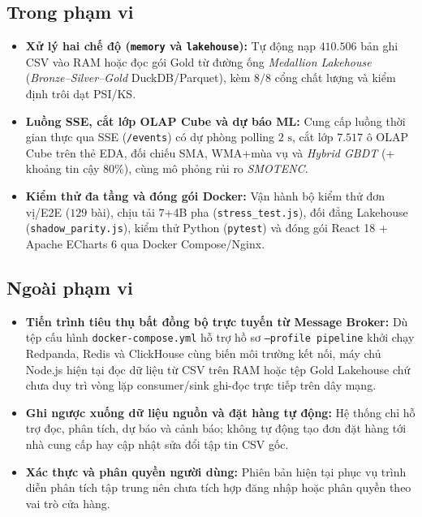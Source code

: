 \subsection*{Trong phạm vi}
\label{sec:in-scope}
\begin{itemize}[topsep=0pt, itemsep=1pt]
	\item \textbf{Xử lý hai chế độ (\texttt{memory} và \texttt{lakehouse}):} Tự động nạp $410.506$ bản ghi CSV vào RAM hoặc đọc gói Gold từ đường ống \textit{Medallion Lakehouse} (\textit{Bronze--Silver--Gold} DuckDB/Parquet), kèm $8/8$ cổng chất lượng và kiểm định trôi dạt PSI/KS.
	\item \textbf{Luồng SSE, cắt lớp OLAP Cube và dự báo ML:} Cung cấp luồng thời gian thực qua SSE (\texttt{/events}) có dự phòng polling $2\text{ s}$, cắt lớp $7.517$ ô OLAP Cube trên thẻ EDA, đối chiếu SMA, WMA+mùa vụ và \textit{Hybrid GBDT} (+ khoảng tin cậy $80\%$), cùng mô phỏng rủi ro \textit{SMOTENC}.
	\item \textbf{Kiểm thử đa tầng và đóng gói Docker:} Vận hành bộ kiểm thử đơn vị/E2E ($129$ bài), chịu tải $7$+4B pha (\texttt{stress_test.js}), đối đẳng Lakehouse (\texttt{shadow_parity.js}), kiểm thử Python (\texttt{pytest}) và đóng gói React 18 + Apache ECharts 6 qua Docker Compose/Nginx.
\end{itemize}

\subsection*{Ngoài phạm vi}
\label{sec:out-of-scope}
\begin{itemize}[topsep=0pt, itemsep=1pt]
	\item \textbf{Tiến trình tiêu thụ bất đồng bộ trực tuyến từ Message Broker:} Dù tệp cấu hình \texttt{docker-compose.yml} hỗ trợ hồ sơ \texttt{--profile pipeline} khởi chạy Redpanda, Redis và ClickHouse cùng biến môi trường kết nối, máy chủ Node.js hiện tại đọc dữ liệu từ CSV trên RAM hoặc tệp Gold Lakehouse chứ chưa duy trì vòng lặp consumer/sink ghi-đọc trực tiếp trên dây mạng.
	\item \textbf{Ghi ngược xuống dữ liệu nguồn và đặt hàng tự động:} Hệ thống chỉ hỗ trợ đọc, phân tích, dự báo và cảnh báo; không tự động tạo đơn đặt hàng tới nhà cung cấp hay cập nhật sửa đổi tập tin CSV gốc.
	\item \textbf{Xác thực và phân quyền người dùng:} Phiên bản hiện tại phục vụ trình diễn phân tích tập trung nên chưa tích hợp đăng nhập hoặc phân quyền theo vai trò cửa hàng.
\end{itemize}

